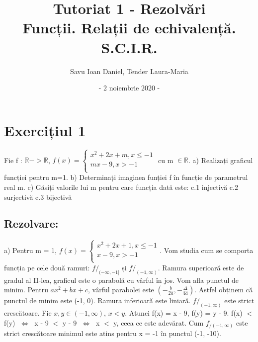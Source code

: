 \documentclass{article}
\title{Tutoriat 1 - Rezolvări\\
\Large Funcții. Relații de echivalență. S.C.I.R.}
\date{- 2 noiembrie 2020 -}
\author{Savu Ioan Daniel, Tender Laura-Maria}
\newcommand\tab[1][1cm]{\hspace*{#1}}
\DeclareRobustCommand\iff{\;\Longleftrightarrow\;}
\begin{document}
\maketitle

\section{Exercițiul 1}
Fie f : $\mathbb{R} -> \mathbb{R}$, $f(x) =  \begin{cases} 
    x^2+2x+m, x \leq -1 \\
    mx-9, x > -1 \\
   \end{cases}
$ cu m $\in \mathbb{R}$.
\newline
\newline
a) Realizați graficul funcției pentru m=1.
\newline
b) Determinați imaginea funției f în funcție de parametrul real m.
\newline
c) Găsiți valorile lui m pentru care funcția dată este:
\newline
\tab c.1 injectivă
\newline
\tab c.2 surjectivă
\newline
\tab c.3 bijectivă

\subsection{Rezolvare:}

a) Pentru m = 1, $f(x) = \begin{cases}
    x^2+2x+1, x\leq - 1\\
    x-9, x > -1 \\
    \end{cases}$.
\newline
Vom studia cum se comporta funcția pe cele două ramuri: $f/_{(-\infty, -1]}$ și $f/_{(-1, \infty)}$. 
\newline
Ramura superioară este de gradul al II-lea, graficul este o parabolă cu vârful în jos. Vom afla punctul de minim.
Pentru $ax^2 + bx + c$, vârful parabolei este $( - \frac{b}{2a}, -\frac{\Delta}{4a}) $. Astfel obținem că punctul de minim este (-1, 0).
\newline
Ramura inferioară este liniară. $f/_{(-1, \infty)}$ este strict crescătoare. Fie $x, y \in (-1, \infty), \, x < y$. Atunci f(x) = x - 9, f(y) = y - 9. f(x) $<$ f(y) $\iff$ x - 9 $<$ y - 9 $\iff$ x $<$ y, ceea ce este adevărat. Cum $f_{/(-1, \infty)}$ este strict crescătoare minimul este atins pentru x = -1 în punctul (-1, -10).
\end{document}
